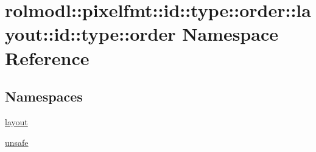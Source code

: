 \hypertarget{namespacerolmodl_1_1pixelfmt_1_1id_1_1type_1_1order_1_1layout_1_1id_1_1type_1_1order}{}\section{rolmodl\+::pixelfmt\+::id\+::type\+::order\+::layout\+::id\+::type\+::order Namespace Reference}
\label{namespacerolmodl_1_1pixelfmt_1_1id_1_1type_1_1order_1_1layout_1_1id_1_1type_1_1order}
\subsection*{Namespaces}
\begin{DoxyCompactItemize}
\item 
 \mbox{\hyperlink{namespacerolmodl_1_1pixelfmt_1_1id_1_1type_1_1order_1_1layout_1_1id_1_1type_1_1order_1_1layout}{layout}}
\item 
 \mbox{\hyperlink{namespacerolmodl_1_1pixelfmt_1_1id_1_1type_1_1order_1_1layout_1_1id_1_1type_1_1order_1_1unsafe}{unsafe}}
\end{DoxyCompactItemize}
